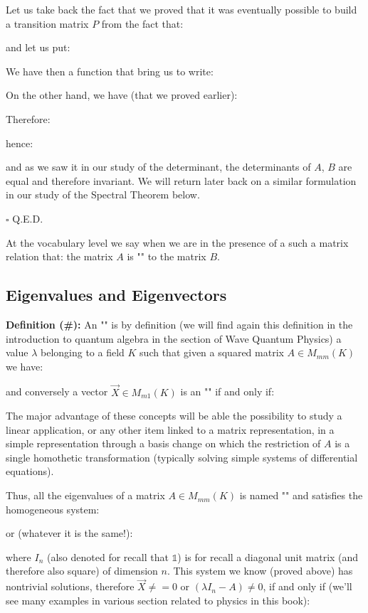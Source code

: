 	\begin{dem}
	Let us take back the fact that we proved that it was eventually possible to build a transition matrix $P$ from the fact that:
	
	and let us put:
	
	We have then a function that bring us to write:
	
	On the other hand, we have (that we proved earlier):
	
	Therefore:
	
	hence:
	
	and as we saw it in our study of the determinant, the determinants of $A$, $B$ are equal and therefore invariant. We will  return later back on a similar formulation in our study of the Spectral Theorem below.
	\begin{flushright}
		$\square$  Q.E.D.
	\end{flushright}
	\end{dem}
	At the vocabulary level we say when we are in the presence of a such a matrix relation that: the matrix $A$ is "" to the matrix $B$.
	
	\pagebreak
	\subsection{Eigenvalues and Eigenvectors}\label{eigenvector}
	\textbf{Definition (\#\mydef):} An "" is by definition (we will find again this definition in the introduction to quantum algebra in the section of Wave Quantum Physics) a value $\lambda$ belonging to a field $K$ such that given a squared matrix $A\in M_{mm}(K)$ we have:
	
	and conversely a vector $\vec{X}\in M_{m1}(K)$ is an "" if and only if:
	
	The major advantage of these concepts will be able the possibility to study a linear application, or any other item linked to a matrix representation, in a simple representation through a basis change on which the restriction of $A$ is a single homothetic transformation (typically solving simple systems of differential equations).
	
	Thus, all the eigenvalues of a matrix $A\in M_{mm}(K)$ is named "" and satisfies the homogeneous system:
	
	or (whatever it is the same!):
	
	where $I_n$ (also denoted for recall that $\mathds{1}$) is for recall a diagonal unit matrix (and therefore also square) of dimension $n$. This system we know (proved above) has nontrivial solutions, therefore $\vec{X} \neq=0$ or $(\lambda I_n-A)\neq 0$, if and only if (we'll see many examples in various section related to physics in this book):
	

